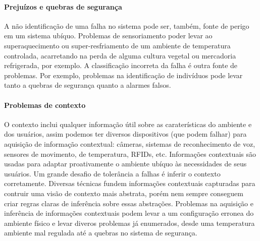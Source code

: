 \paragraph{Prejuízos e quebras de segurança}

A não identificação de uma falha no sistema pode ser, também, fonte de perigo em um sistema ubíquo. Problemas de sensoriamento poder levar ao superaquecimento ou super-resfriamento de um ambiente de temperatura controlada, acarretando na perda de alguma cultura vegetal ou mercadoria refrigerada, por exemplo. A classificação incorreta da falha é outra fonte de problemas. Por exemplo, problemas na identificação de indivíduos pode levar tanto a quebras de segurança quanto a alarmes falsos.

\paragraph{Problemas de contexto}

O contexto inclui qualquer informação útil sobre as caraterísticas do ambiente e dos usuários, assim podemos ter diversos dispositivos (que podem falhar) para aquisição de informação contextual: câmeras, sistemas de reconhecimento de voz, sensores de movimento, de temperatura, RFIDs, etc. Informações contextuais são usadas para adaptar proativamente o ambiente ubíquo às necessidades de seus usuários. Um grande desafio de tolerância a falhas é inferir o contexto corretamente. Diversas técnicas fundem informações contextuais capturadas para contruir uma visão de contexto mais abstrata, porém nem sempre conseguem criar regras claras de inferência sobre essas abstrações. Problemas na aquisição e inferência de informações contextuais podem levar a um configuração erronea do ambiente físico e levar diveros problemas já enumerados, desde uma temperatura ambiente mal regulada até a quebras no sistema de segurança.





